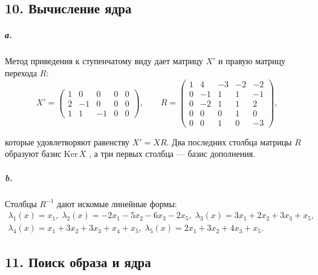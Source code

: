 {\subsection{\normalsize{10. Вычисление ядра}}

\subparagraph{а.} Метод приведения к ступенчатому виду дает матрицу $X'$ и правую матрицу перехода $R$:
\begin{equation*}
X' = \begin{pmatrix} 1 & 0 & 0 & 0 & 0 \\ 2 & -1 & 0 & 0 & 0 \\ 1 & 1 & -1 & 0 & 0 \end{pmatrix}, \qquad R = \begin{pmatrix} 1 & 4 & -3 & -2 & -2 \\ 0 & -1 & 1 & 1 & -1 \\ 0 & -2 & 1 & 1 & 2 \\ 0 & 0 & 0 & 1 & 0 \\ 0 & 0 & 1 & 0 & -3 \end{pmatrix},
\end{equation*}

\noindent которые удовлетворяют равенству $X' = XR$. Два последних столбца
матрицы $R$ образуют базис Ker{$\,X$} , а три первых столбца --- базис до­полнения.

\subparagraph{b.} Столбцы $R^{-1}$ дают искомые линейные формы:
\begin{gather*}
\lambda_{1}(x) = x_1,\;\lambda_{2}(x) = -2x_1 - 5x_2 - 6x_3 - 2x_5,\;\lambda_{3}(x) = 3x_1 + 2x_2 + 3x_3 + x_5, \\
\lambda_{4}(x) = x_1 + 3x_2 + 3x_3 + x_4 + x_5,\;\lambda_{5}(x) = 2x_1 + 3x_2 + 4x_3 + x_5.
\end{gather*}

\subsection{\normalsize{11. Поиск образа и ядра}} 

}
